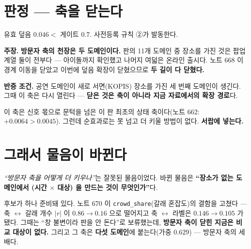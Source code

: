 \documentclass[10pt,a4paper]{article}
\newcommand{\claim}[2]{\begin{claimbox}\textbf{주장.} #1\par\smallskip
  \textcolor{gray!70}{\textbf{반증 조건.} #2}\end{claimbox}}
\begin{document}
\section{판정 --- 축을 닫는다}

유효 덮음 $0.046 <$ 게이트 $0.7$. 사전등록 규칙 ②가 발동한다.

\claim{\textbf{방문자 축의 천장은 두 도메인이다.} 판의 11개 도메인 중 장소를 가진 것은
팝업 계열 둘이 전부다 --- 아이돌까지 확인했고 나머지 여덟은 온라인 출시다. 노트 668 이
경계 이동을 닫았고 이번에 덮음 확장이 닫혔으므로 \textbf{두 길이 다 닫혔다.}}
{공연 도메인이 새로 서면(KOPIS) 장소를 가진 세 번째 도메인이 생긴다. 그때 이 축은
다시 열린다 --- \textbf{닫은 것은 축이 아니라 지금 자료에서의 확장 경로}다.}

이 축은 신호 몫으로 문턱을 넘은 이 판 최초의 상태 축이다(노트 662:
$+0.0064 > 0.0045$). 그런데 순효과로는 못 넘고 더 키울 방법이 없다. \textbf{서랍에
넣는다.}

\section{그래서 물음이 바뀐다}

\emph{``방문자 축을 어떻게 더 키우나''}는 잘못된 물음이었다. 바뀐 물음은
\textbf{``장소가 없는 도메인에서 (시간 $\times$ 대상) 을 만드는 것이 무엇인가''}다.

후보가 하나 준비돼 있다. 노트 670 이 \verb|crowd_share|(갈래 혼잡도)의 결함을 고쳤다
--- 축 $\leftrightarrow$ 갈래 개수 $|r|$ 이 $0.86 \to 0.16$ 으로 떨어지고 축
$\leftrightarrow$ 라벨은 $0.146 \to 0.105$ 가 됐다. 그때는 ``창 불변이라 판을 안
돈다''로 보류했는데, \textbf{방문자 축이 닫힌 지금은 비교 대상이 없다.} 그리고 그 축은
\textbf{다섯 도메인}에 붙는다(가중 $0.629$) --- 방문자 축의 세 배다.
\end{document}
